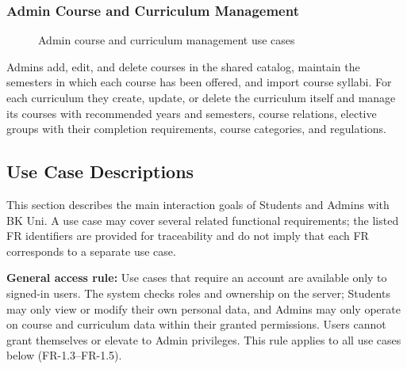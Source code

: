 \subsubsection{Admin Course and Curriculum Management}
\begin{figure}[H]
    \centering
    
    \caption{Admin course and curriculum management use cases}
\end{figure}
Admins add, edit, and delete courses in the shared catalog, maintain the semesters in which each course has been offered, and import course syllabi. For each curriculum they create, update, or delete the curriculum itself and manage its courses with recommended years and semesters, course relations, elective groups with their completion requirements, course categories, and regulations.

\subsection{Use Case Descriptions}

This section describes the main interaction goals of Students and Admins with BK Uni. A use case may cover several related functional requirements; the listed FR identifiers are provided for traceability and do not imply that each FR corresponds to a separate use case.

\textbf{General access rule:} Use cases that require an account are available only to signed-in users. The system checks roles and ownership on the server; Students may only view or modify their own personal data, and Admins may only operate on course and curriculum data within their granted permissions. Users cannot grant themselves or elevate to Admin privileges. This rule applies to all use cases below (FR-1.3--FR-1.5).

